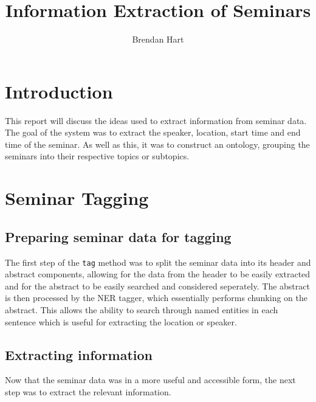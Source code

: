 \documentclass[10pt]{article}
\title{Information Extraction of Seminars}
\author{Brendan Hart}
\begin{document}
\maketitle

\begin{multicols}{2}

\section{Introduction}
This report will discuss the ideas used to extract information from seminar data. The goal of the system was to extract the speaker, location, start time and end time of the seminar. As well as this, it was to construct an ontology, grouping the seminars into their respective topics or subtopics.

\section{Seminar Tagging}
\subsection{Preparing seminar data for tagging}
The first step of the {{\tt tag}} method was to split the seminar data into its header and abstract components, allowing for the data from the header to be easily extracted and for the abstract to be easily searched and considered seperately. The abstract is then processed by the NER tagger, which essentially performs chunking on the abstract. This allows the ability to search through named entities in each sentence which is useful for extracting the location or speaker.
\subsection{Extracting information}
Now that the seminar data was in a more useful and accessible form, the next step was to extract the relevant information.

\end{multicols}
\end{document}
